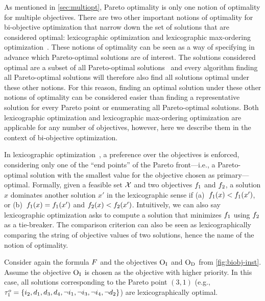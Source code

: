 As mentioned in \cref{sec:multiopt}, Pareto optimality is only one notion of optimality for multiple objectives.
There are two other important notions of optimality for bi-objective optimization that narrow down the set of solutions that are considered optimal:
lexicographic optimization and lexicographic max-ordering optimization~\autocite{Ehrgott2005-5}.
These notions of optimality can be seen as a way of specifying in advance which Pareto-optimal solutions are of interest.
The solutions considered optimal are a subset of all Pareto-optimal solutions~\autocite{Ehrgott2005-5} and every algorithm finding all Pareto-optimal solutions will therefore also find all solutions optimal under these other notions.
For this reason, finding an optimal solution under these other notions of optimality can be considered easier than finding a representative solution for every Pareto point or enumerating all Pareto-optimal solutions.
Both lexicographic optimization and lexicographic max-ordering optimization are applicable for any number of objectives, however, here we describe them in the context of bi-objective optimization.

In lexicographic optimization~\autocite{Ehrgott2005-5}, a preference over the objectives is enforced, considering only one of the ``end points'' of the Pareto front---i.e., a Pareto-optimal solution with the smallest value for the objective chosen as primary---optimal.
Formally, given a feasible set $\mathcal{X}$ and two objectives $f_1$ and $f_2$, a solution $x$ dominates another solution $x'$ in the lexicographic sense if (a)~$f_1(x) < f_1(x')$, or (b)~$f_1(x) = f_1(x')$ and $f_2(x) < f_2(x')$.
Intuitively, we can also say lexicographic optimization asks to compute a solution that minimizes $f_1$ using $f_2$ as a tie-breaker.
The comparison criterion can also be seen as lexicographically comparing the string of objective values of two solutions, hence the name of the notion of optimality.

\begin{example}
  Consider again the formula $F$ and the objectives $\textsc{O}_{\text{I}}$ and $\textsc{O}_{\text{D}}$ from \cref{fig:biobj-inst}.
  Assume the objective $\textsc{O}_{\text{I}}$ is chosen as the objective with higher priority.
  In this case, all solutions corresponding to the Pareto point $(3,1)$ (e.g., $\tau^o_1 = \{i_2,\allowbreak d_1,\allowbreak d_3,\allowbreak d_4,\allowbreak \lnot i_1,\allowbreak \lnot i_3,\allowbreak \lnot i_4,\allowbreak \lnot d_2\}$) are lexicographically optimal.
\end{example}

